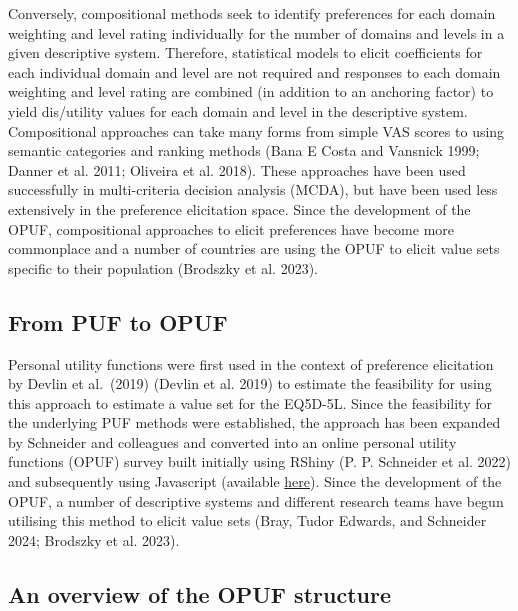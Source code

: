 \documentclass[
  letterpaper,
  DIV=11,
  numbers=noendperiod]{scrartcl}
\begin{document}
Conversely, compositional methods seek to identify preferences for each
domain weighting and level rating individually for the number of domains
and levels in a given descriptive system. Therefore, statistical models
to elicit coefficients for each individual domain and level are not
required and responses to each domain weighting and level rating are
combined (in addition to an anchoring factor) to yield dis/utility
values for each domain and level in the descriptive system.
Compositional approaches can take many forms from simple VAS scores to
using semantic categories and ranking methods (Bana E Costa and Vansnick
1999; Danner et al. 2011; Oliveira et al. 2018). These approaches have
been used successfully in multi-criteria decision analysis (MCDA), but
have been used less extensively in the preference elicitation space.
Since the development of the OPUF, compositional approaches to elicit
preferences have become more commonplace and a number of countries are
using the OPUF to elicit value sets specific to their population
(Brodszky et al. 2023).

\subsection{From PUF to OPUF}\label{from-puf-to-opuf}

Personal utility functions were first used in the context of preference
elicitation by Devlin et al.~(2019) (Devlin et al. 2019) to estimate the
feasibility for using this approach to estimate a value set for the
EQ5D-5L. Since the feasibility for the underlying PUF methods were
established, the approach has been expanded by Schneider and colleagues
and converted into an online personal utility functions (OPUF) survey
built initially using RShiny (P. P. Schneider et al. 2022) and
subsequently using Javascript (available
\href{https://eq5d5l.me}{here}). Since the development of the OPUF, a
number of descriptive systems and different research teams have begun
utilising this method to elicit value sets (Bray, Tudor Edwards, and
Schneider 2024; Brodszky et al. 2023).

\subsection{An overview of the OPUF
structure}\label{an-overview-of-the-opuf-structure}
\end{document}
